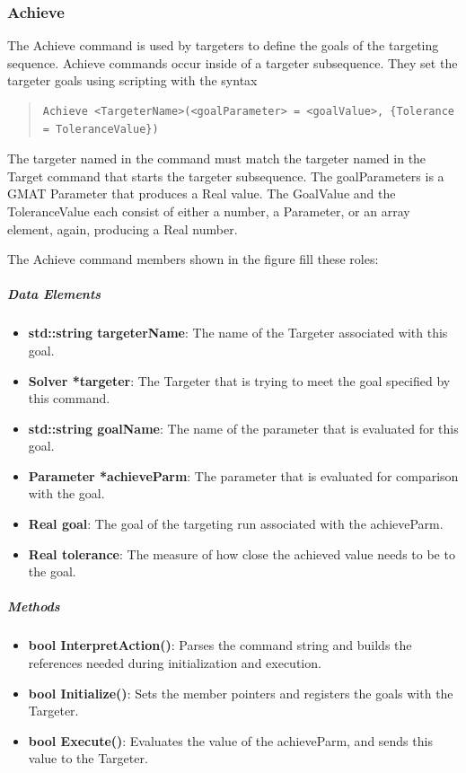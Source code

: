 \subsubsection{Achieve}

The Achieve command is used by targeters to define the goals of the targeting sequence.  Achieve
commands occur inside of a targeter subsequence.  They set the targeter goals using scripting with
the syntax

\begin{quote}
\begin{verbatim}
Achieve <TargeterName>(<goalParameter> = <goalValue>, {Tolerance = ToleranceValue})
\end{verbatim}
\end{quote}

\noindent The targeter named in the command must match the targeter named in the Target command that
starts the targeter subsequence.  The goalParameters is a GMAT Parameter that produces a Real
value. The GoalValue and the ToleranceValue each consist of  either a number, a Parameter, or an
array element, again, producing a Real number.

The Achieve command members shown in the figure fill these roles:

\subparagraph{Data Elements}

\begin{itemize}
\item \textbf{std::string targeterName}: The name of the Targeter associated with this goal.
\item \textbf{Solver *targeter}: The Targeter that is trying to meet the goal specified by this
command.
\item \textbf{std::string goalName}: The name of the parameter that is evaluated for this goal.
\item \textbf{Parameter *achieveParm}: The parameter that is evaluated for comparison with the goal.
\item \textbf{Real goal}:  The goal of the targeting run associated with the achieveParm.
\item \textbf{Real tolerance}:  The measure of how close the achieved value needs to be to the goal.
\end{itemize}

\subparagraph{Methods}

\begin{itemize}
\item \textbf{bool InterpretAction()}: Parses the command string and builds the references needed
during initialization and execution.
\item \textbf{bool Initialize()}: Sets the member pointers and registers the goals with the
Targeter.
\item \textbf{bool Execute()}: Evaluates the value of the achieveParm, and sends this value to the
Targeter.
\end{itemize}

